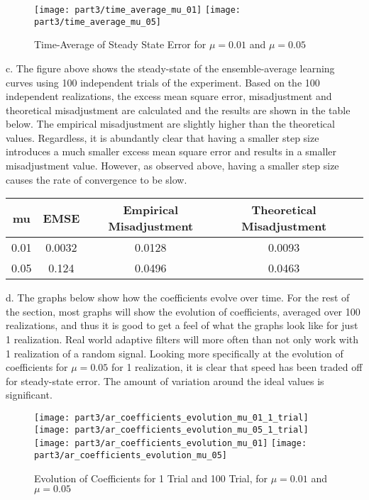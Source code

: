 \begin{figure}[H]
\centering{}
\texttt{[image: part3/time\_average\_mu\_01]}
\texttt{[image: part3/time\_average\_mu\_05]}
\caption{Time-Average of Steady State Error for $\mu=0.01$ and $\mu=0.05$}
\end{figure}


\noindent{}c. The figure above shows the steady-state of the ensemble-average learning curves using 100 independent trials of the experiment. Based on the 100 independent realizations, the excess mean square error, misadjustment and theoretical misadjustment are calculated and the results are shown in the table below. The empirical misadjustment are slightly higher than the theoretical values. Regardless, it is abundantly clear that having a smaller step size introduces a much smaller excess mean square error and results in a smaller misadjustment value. However, as observed above, having a smaller step size causes the rate of convergence to be slow.  

\begin{table}[H]
\centering
\label{my-label}
\begin{tabular}{|c|c|c|c|c|}
\hline
mu   & EMSE   & Empirical Misadjustment 	& Theoretical Misadjustment		\\ \hline
0.01 & 0.0032 & 0.0128                 	& 0.0093                   		\\ \hline
0.05 & 0.124  & 0.0496                 	& 0.0463                  		\\ \hline
\end{tabular}
\end{table}

\noindent{}d. The graphs below show how the coefficients evolve over time. For the rest of the section, most graphs will show the evolution of coefficients, averaged over 100 realizations, and thus it is good to get a feel of what the graphs look like for just 1 realization. Real world adaptive filters will more often than not only work with 1 realization of a random signal. Looking more specifically at the evolution of coefficients for $\mu=0.05$ for 1 realization, it is clear that speed has been traded off for steady-state error. The amount of variation around the ideal values is significant.

\begin{figure}[H]
\centering{}
\texttt{[image: part3/ar\_coefficients\_evolution\_mu\_01\_1\_trial]}
\texttt{[image: part3/ar\_coefficients\_evolution\_mu\_05\_1\_trial]} \\ 
\texttt{[image: part3/ar\_coefficients\_evolution\_mu\_01]}
\texttt{[image: part3/ar\_coefficients\_evolution\_mu\_05]}
\caption{Evolution of Coefficients for 1 Trial and 100 Trial, for $\mu=0.01$ and $\mu=0.05$}
\label{fig:steady_state_convergence}
\end{figure}

